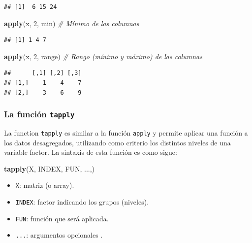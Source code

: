 \documentclass[]{book}
\newenvironment{Shaded}{\begin{snugshade}}{\end{snugshade}}
\newcommand{\KeywordTok}[1]{\textcolor[rgb]{0.13,0.29,0.53}{\textbf{#1}}}
\newcommand{\DecValTok}[1]{\textcolor[rgb]{0.00,0.00,0.81}{#1}}
\newcommand{\CommentTok}[1]{\textcolor[rgb]{0.56,0.35,0.01}{\textit{#1}}}
\newcommand{\NormalTok}[1]{#1}
\providecommand{\tightlist}{%
  \setlength{\itemsep}{0pt}\setlength{\parskip}{0pt}}
\begin{document}
\begin{verbatim}
## [1]  6 15 24
\end{verbatim}

\begin{Shaded}
\begin{Highlighting}[]
\KeywordTok{apply}\NormalTok{(x, }\DecValTok{2}\NormalTok{, min)    }\CommentTok{# Mínimo de las columnas}
\end{Highlighting}
\end{Shaded}

\begin{verbatim}
## [1] 1 4 7
\end{verbatim}

\begin{Shaded}
\begin{Highlighting}[]
\KeywordTok{apply}\NormalTok{(x, }\DecValTok{2}\NormalTok{, range)  }\CommentTok{# Rango (mínimo y máximo) de las columnas}
\end{Highlighting}
\end{Shaded}

\begin{verbatim}
##      [,1] [,2] [,3]
## [1,]    1    4    7
## [2,]    3    6    9
\end{verbatim}

\subsubsection{\texorpdfstring{La función
\texttt{tapply}}{La función tapply}}\label{la-funcion-tapply}

La function \texttt{tapply} es similar a la función \texttt{apply} y
permite aplicar una función a los datos desagregados, utilizando como
criterio los distintos niveles de una variable factor. La sintaxis de
esta función es como sigue:

\begin{Shaded}
\begin{Highlighting}[]
    \KeywordTok{tapply}\NormalTok{(X, INDEX, FUN, ...,)}
\end{Highlighting}
\end{Shaded}

\begin{itemize}
\tightlist
\item
  \texttt{X}: matriz (o array).
\item
  \texttt{INDEX}: factor indicando los grupos (niveles).
\item
  \texttt{FUN}: función que será aplicada.
\item
  \texttt{...}: argumentos opcionales .
\end{itemize}
\end{document}
